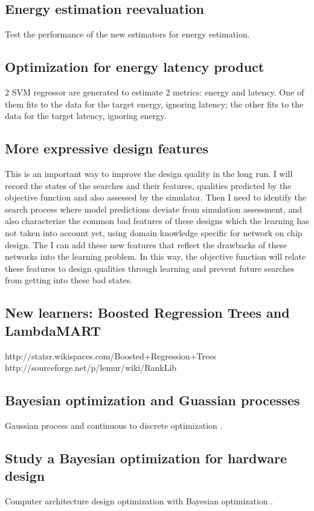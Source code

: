 \documentclass[12pt]{article}
\theoremstyle{definition}
\begin{document}
\subsection{Energy estimation reevaluation}
Test the performance of the new estimators for energy estimation.
\subsection{Optimization for energy latency product}
2 SVM regressor are generated to estimate 2 metrics: energy and latency. One of them fits to the data for the target energy, ignoring latency; the other fits to the data for the target latency, ignoring energy.
\subsection{More expressive design features}
This is an important way to improve the design quality in the long run. I will record the states of the searches and their features, qualities predicted by the objective function and also assessed by the simulator. Then I need to identify the search process where model predictions deviate from simulation assessment, and also characterize the common bad features of these designs which the learning has not taken into account yet, using domain knowledge specific for network on chip design. The I can add these new features that reflect the drawbacks of these networks into the learning problem. In this way, the objective function will relate these features to design qualities through learning and prevent future searches from getting into these bad states.
\subsection{New learners: Boosted Regression Trees and LambdaMART}
http://statsr.wikispaces.com/Boosted+Regression+Trees\\
http://sourceforge.net/p/lemur/wiki/RankLib
\subsection{Bayesian optimization and Guassian processes}
Gaussian process and continuous to discrete optimization \cite{brochu2010tutorial}.
\subsection{Study a Bayesian optimization for hardware design}
Computer architecture design optimization with Bayesian optimization \cite{demasiusing}.
\end{document}

